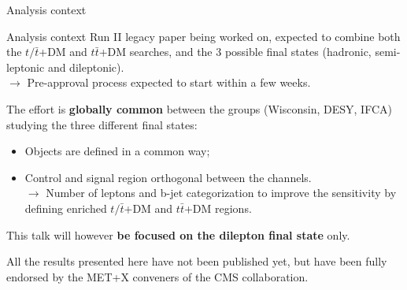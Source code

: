 \documentclass[8pt]{beamer}
\begin{document}
\begin{frame}[standout]
Analysis context
\end{frame}

\begin{frame}{Analysis context}
\justifying
Run II legacy paper being worked on, expected to \alert{combine both the $t/\bar t$+DM and $t \bar t$+DM searches}, and the 3 possible final states (hadronic, semi-leptonic and dileptonic). \\
\hspace{10pt} $\rightarrow$ Pre-approval process expected to start within a few weeks. \vfill

The effort is \textbf{globally common} between the groups (Wisconsin, DESY, IFCA) studying the three different final states:
\begin{itemize}
\justifying
\item Objects are defined in a common way;
\item Control and signal region orthogonal between the channels.\\
$\rightarrow$ Number of leptons and b-jet categorization to improve the sensitivity by defining enriched $t/\bar t$+DM and $t \bar t$+DM regions.
\end{itemize} \vfill

This talk will however \textbf{be focused on the dilepton final state} only. \vfill
\begin{block}{}
\begin{center}
All the results presented here have not been published yet, but have been fully endorsed by the MET+X conveners of the CMS collaboration.
\end{center}
\end{block} \vfill
\end{frame}
\end{document}
